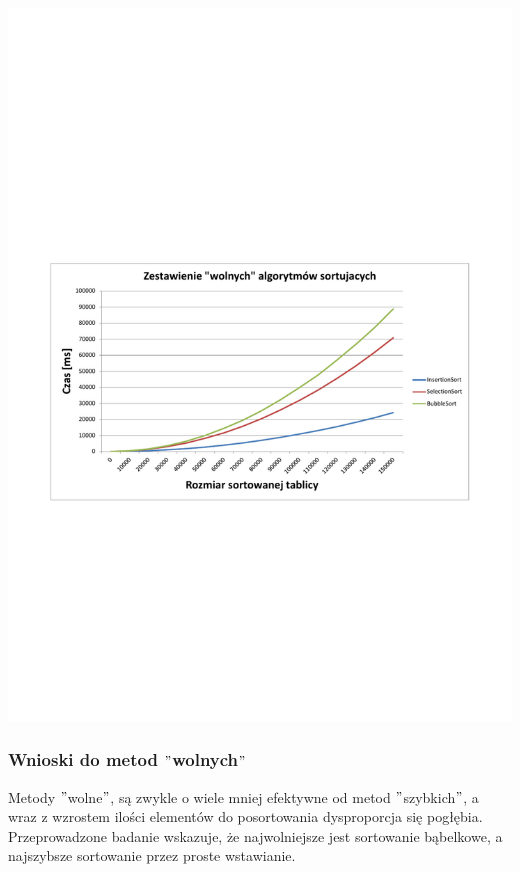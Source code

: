 \documentclass[polish,polish,a4paper]{article}
\begin{document}
\begin{spacing}{1.5}
	\begin{minipage}[H]{\textwidth}
		\begin{center}
					\includegraphics[scale=0.85]{zad2wolne.pdf}
					\label{fig:zad2wolne}
		\end{center}
	\end{minipage}

\subsubsection{Wnioski do metod $"$wolnych$"$}

Metody $"$wolne$"$, są zwykle o wiele mniej efektywne od metod $"$szybkich$"$, a wraz z wzrostem ilości elementów do posortowania dysproporcja się pogłębia. Przeprowadzone badanie wskazuje, że najwolniejsze jest sortowanie bąbelkowe, a najszybsze sortowanie przez proste wstawianie.
	

\end{spacing}
\end{document}
